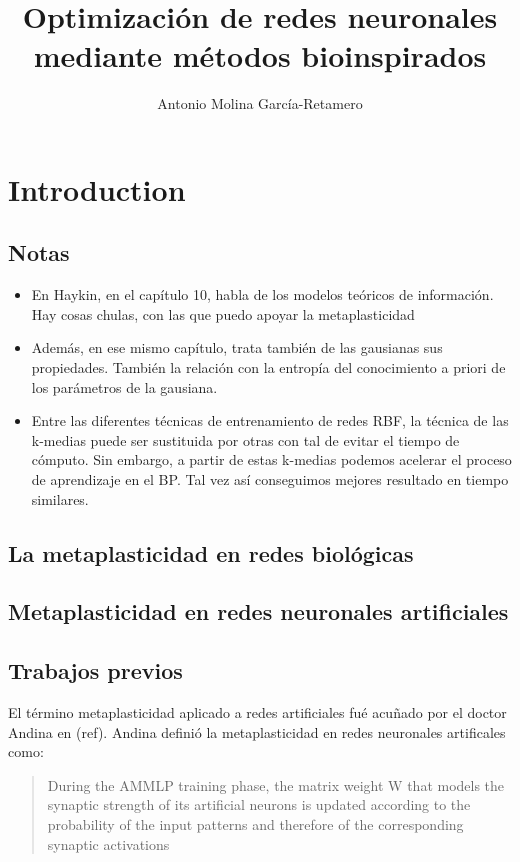 \documentclass[10pt,a4paper, twocolumn]{report}
\author{Antonio Molina García-Retamero}
\title{Optimización de redes neuronales mediante métodos bioinspirados}
\begin{document}
\onecolumn
\maketitle
\pagebreak
\tableofcontents
\pagebreak
\twocolumn

\chapter{Introduction}
\section{Notas}
\begin{itemize}
	\item En Haykin, en el capítulo 10, habla de los modelos teóricos de información. Hay cosas chulas, con las que puedo apoyar la metaplasticidad
	 \item Además, en ese mismo capítulo, trata también de las gausianas sus propiedades. También la relación con la entropía del conocimiento a priori de los parámetros de la gausiana.
	 \item Entre las diferentes técnicas de entrenamiento de redes RBF, la técnica de las k-medias puede ser sustituida por otras con tal de evitar el tiempo de cómputo. Sin embargo, a partir de estas k-medias podemos acelerar el proceso de aprendizaje en el BP. Tal vez así conseguimos mejores resultado en tiempo similares.
\end{itemize}

\section{La metaplasticidad en redes biológicas}

\section{Metaplasticidad en redes neuronales artificiales}
\section{Trabajos previos}
El término metaplasticidad aplicado a redes artificiales fué acuñado por el doctor Andina en (ref). Andina definió la metaplasticidad en redes neuronales artificales como:
\begin{quote}
During the AMMLP training phase, the matrix weight W that models the synaptic strength of its artificial neurons is updated according to the probability of the input patterns and therefore of the corresponding synaptic activations
\end{quote}
\end{document}
